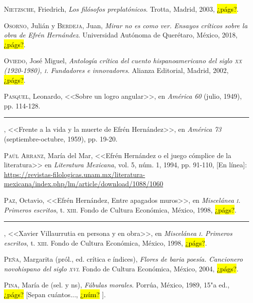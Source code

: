 \documentclass[14pt,twoside,final]{extbook} %
\begin{document}
\textsc{Nietzsche}, Friedrich, \emph{Los filósofos preplatónicos}. Trotta, Madrid, 2003, \hl{¿págs?}.\label{bib:nietzche2003}

\textsc{Osorno}, Julián y \textsc{Berdeja}, Juan, \emph{Mirar no es como ver. Ensayos críticos sobre la obra de Efrén Hernández}. Universidad Autónoma de Querétaro, México, 2018, \hl{¿págs?}.\label{bib:osorno2018}

\textsc{Oviedo}, José Miguel, \emph{Antología crítica del cuento hispanoamericano del siglo \textsc{xx} (1920-1980), \textsc{i}. Fundadores e innovadores}. Alianza Editorial, Madrid, 2002, \hl{¿págs?}.\label{bib:oviedo2002}

\textsc{Pasquel}, Leonardo, <<Sobre un logro angular>>, en \emph{América 60} (julio, 1949), pp. 114-128.\label{bib:pasquel1949}

\rule{1cm}{0.4pt}, <<Frente a la vida y la muerte de Efrén Hernández>>, en \emph{América 73} (septiembre-octubre, 1959), pp. 19-20.\label{bib:pasquel1959}

\textsc{Paúl Arranz}, María del Mar, <<Efrén Hernández o el juego cómplice de la literatura>> en \emph{Literatura Mexicana}, vol. 5, núm. 1, 1994, pp. 91-110, [En línea]: \url{https://revistas-filologicas.unam.mx/literatura-mexicana/index.php/lm/article/download/1088/1060}\label{bib:paul1994}

\textsc{Paz}, Octavio, <<Efrén Hernández, Entre apagados muros>>, en \emph{Miscelánea \textsc{i}. Primeros escritos}, t. \textsc{xiii}. Fondo de Cultura Económica, México, 1998, \hl{¿págs?}.\label{bib:paz1998a}

\rule{1cm}{0.4pt}, <<Xavier Villaurrutia en persona y en obra>>, en \emph{Miscelánea \textsc{i}. Primeros escritos}, t. \textsc{xiii}. Fondo de Cultura Económica, México, 1998, \hl{¿págs?}.\label{bib:paz1998b}

\textsc{Peña}, Margarita (pról., ed. crítica e índices), \emph{Flores de baria poesía. Cancionero novohispano del siglo \textsc{xvi}}. Fondo de Cultura Económica, México, 2004, \hl{¿págs?}.\label{bib:peña2004}

\textsc{Pina}, María de (sel. y ns), \emph{Fábulas morales}. Porrúa, México, 1989, 15"a ed., \hl{¿págs?} [Sepan cuántos..., \hl{¿núm?} ].\label{bib:pina1989}
\end{document}
